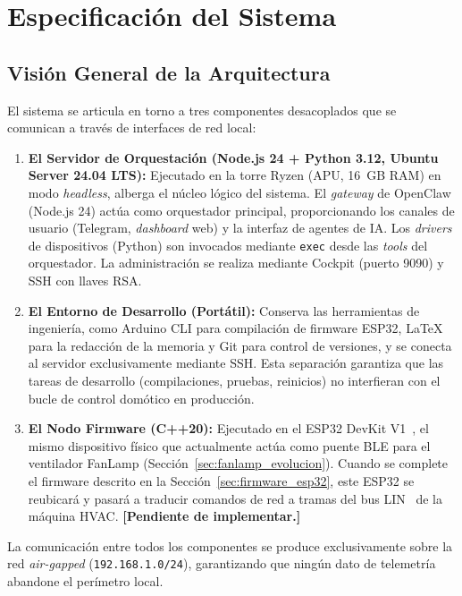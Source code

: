 \chapter{Especificación del Sistema}
\label{cap:especificacion_sistema}

\section{Visión General de la Arquitectura}

El sistema se articula en torno a tres componentes desacoplados que se comunican a través de interfaces de red local:

\begin{enumerate}
    \item \textbf{El Servidor de Orquestación (Node.js 24 + Python 3.12, Ubuntu Server 24.04 LTS):} Ejecutado en la torre Ryzen (APU, 16~GB RAM) en modo \textit{headless}, alberga el núcleo lógico del sistema. El \textit{gateway} de OpenClaw~\cite{openclaw} (Node.js 24) actúa como orquestador principal, proporcionando los canales de usuario (Telegram, \textit{dashboard} web) y la interfaz de agentes de IA. Los \textit{drivers} de dispositivos (Python) son invocados mediante \texttt{exec} desde las \textit{tools} del orquestador. La administración se realiza mediante Cockpit (puerto 9090) y SSH con llaves RSA.
    \item \textbf{El Entorno de Desarrollo (Portátil):} Conserva las herramientas de ingeniería, como Arduino CLI para compilación de firmware ESP32, \LaTeX{} para la redacción de la memoria y Git para control de versiones, y se conecta al servidor exclusivamente mediante SSH. Esta separación garantiza que las tareas de desarrollo (compilaciones, pruebas, reinicios) no interfieran con el bucle de control domótico en producción.
    \item \textbf{El Nodo Firmware (C++20):} Ejecutado en el ESP32 DevKit V1~\cite{espressif_esp32_trm}, el mismo dispositivo físico que actualmente actúa como puente BLE para el ventilador FanLamp (Sección~\ref{sec:fanlamp_evolucion}). Cuando se complete el firmware descrito en la Sección~\ref{sec:firmware_esp32}, este ESP32 se reubicará y pasará a traducir comandos de red a tramas del bus LIN~\cite{iso_17987_2025} de la máquina HVAC. \textbf{[Pendiente de implementar.]}
\end{enumerate}

La comunicación entre todos los componentes se produce exclusivamente sobre la red \textit{air-gapped} (\texttt{192.168.1.0/24}), garantizando que ningún dato de telemetría abandone el perímetro local.

